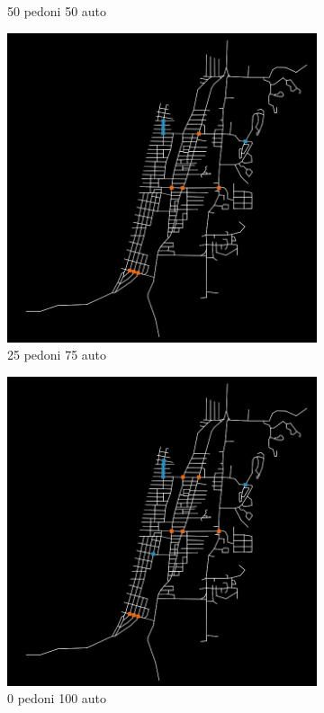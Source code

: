 \begin{figure}[ht]
\begin{subfigure}{0.475\textwidth}
        \caption{50 pedoni 50 auto}
    \end{subfigure}
    \begin{subfigure}{0.475\textwidth}
        \centering
        \includegraphics[width=\textwidth]{images/analisi/comparison-base-in-out-flow-25-75-car.png}
        \caption{25 pedoni 75 auto}
    \end{subfigure}
    \begin{subfigure}{0.475\textwidth}
        \centering
        \includegraphics[width=\textwidth]{images/analisi/comparison-base-in-out-flow-0-100-car.png}
        \caption{0 pedoni 100 auto}
    \end{subfigure}
    \caption{}
    \label{fig:analisi-comparison-in-out-flow-map-base}
\end{figure}

